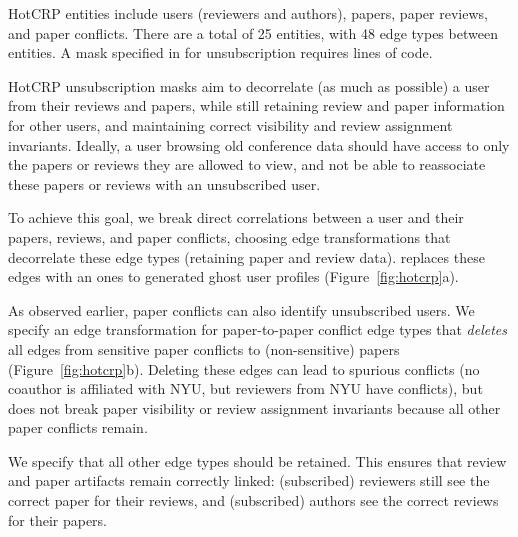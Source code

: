 HotCRP entities include users (reviewers and authors), papers, paper reviews, and
paper conflicts. There are a total of 25 entities, with 48 edge types between entities. A
mask specified in \sys for unsubscription requires  lines of code.

HotCRP unsubscription masks aim to decorrelate (as much as possible) a user from their reviews and
papers, while still retaining review and paper information for other users, and maintaining correct
visibility and review assignment invariants. Ideally, a user browsing old conference data should
have access to only the papers or reviews they are allowed to view, and not be able to reassociate
these papers or reviews with an unsubscribed user.

To achieve this goal, we break direct correlations between a user and their papers,
reviews, and paper conflicts, choosing edge transformations that decorrelate these edge types
(retaining paper and review data). \sys replaces these edges with an ones to generated ghost user
profiles (Figure~\ref{fig:hotcrp}a).


As observed earlier, paper conflicts can also identify unsubscribed users. We specify  
an edge transformation for paper-to-paper conflict edge types that \emph{deletes} all
edges from sensitive paper conflicts to (non-sensitive) papers (Figure~\ref{fig:hotcrp}b).
Deleting these edges can lead to spurious conflicts (\eg no
coauthor is affiliated with NYU, but reviewers from NYU have conflicts), but does not break paper
visibility or review assignment invariants because all other paper conflicts remain. 

We specify that all other edge types should be retained. This ensures that
review and paper artifacts remain correctly linked: (subscribed) reviewers still see the correct
paper for their reviews, and (subscribed) authors see the correct reviews for their papers.
 
